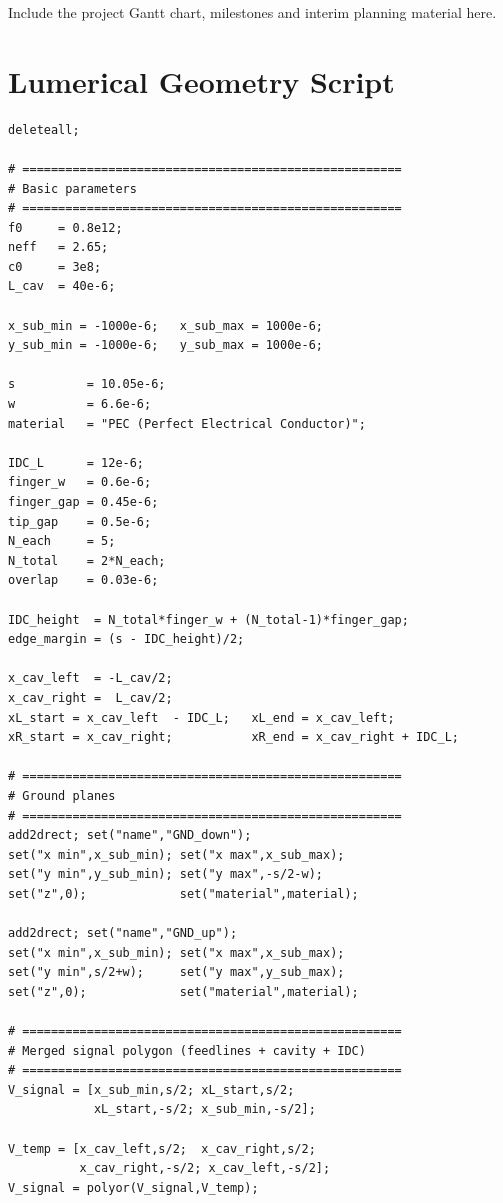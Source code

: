 \documentclass[12pt,a4paper]{article}
\begin{document}
Include the project Gantt chart, milestones and interim planning
material here.

\section{Lumerical Geometry Script}
\label{app:lumerical}

\begin{lstlisting}[language=Lumerical,
    caption={Lumerical LSF script for the IDC-coupled CPW resonator
             with $N = 5+5$ finger geometry.},
    label={lst:lumerical}]
deleteall;

# =====================================================
# Basic parameters
# =====================================================
f0     = 0.8e12;
neff   = 2.65;
c0     = 3e8;
L_cav  = 40e-6;

x_sub_min = -1000e-6;   x_sub_max = 1000e-6;
y_sub_min = -1000e-6;   y_sub_max = 1000e-6;

s          = 10.05e-6;
w          = 6.6e-6;
material   = "PEC (Perfect Electrical Conductor)";

IDC_L      = 12e-6;
finger_w   = 0.6e-6;
finger_gap = 0.45e-6;
tip_gap    = 0.5e-6;
N_each     = 5;
N_total    = 2*N_each;
overlap    = 0.03e-6;

IDC_height  = N_total*finger_w + (N_total-1)*finger_gap;
edge_margin = (s - IDC_height)/2;

x_cav_left  = -L_cav/2;
x_cav_right =  L_cav/2;
xL_start = x_cav_left  - IDC_L;   xL_end = x_cav_left;
xR_start = x_cav_right;           xR_end = x_cav_right + IDC_L;

# =====================================================
# Ground planes
# =====================================================
add2drect; set("name","GND_down");
set("x min",x_sub_min); set("x max",x_sub_max);
set("y min",y_sub_min); set("y max",-s/2-w);
set("z",0);             set("material",material);

add2drect; set("name","GND_up");
set("x min",x_sub_min); set("x max",x_sub_max);
set("y min",s/2+w);     set("y max",y_sub_max);
set("z",0);             set("material",material);

# =====================================================
# Merged signal polygon (feedlines + cavity + IDC)
# =====================================================
V_signal = [x_sub_min,s/2; xL_start,s/2;
            xL_start,-s/2; x_sub_min,-s/2];

V_temp = [x_cav_left,s/2;  x_cav_right,s/2;
          x_cav_right,-s/2; x_cav_left,-s/2];
V_signal = polyor(V_signal,V_temp);


\end{lstlisting}
\end{document}
